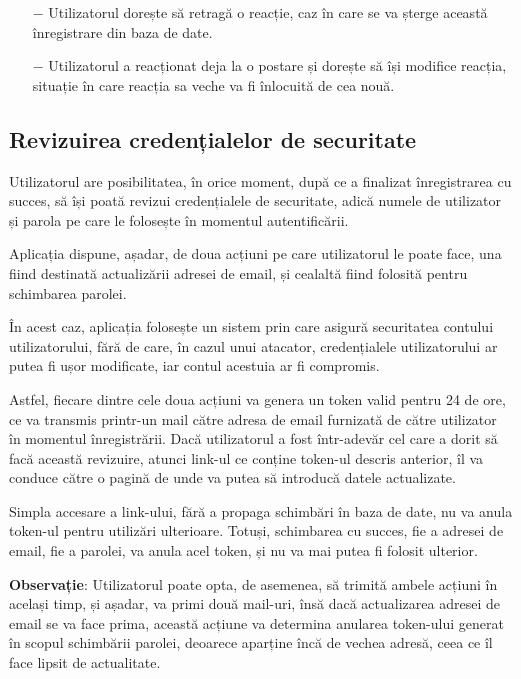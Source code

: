 \begin{itemize}
	\addtolength{\itemindent}{1cm}
	\item[$-$]Utilizatorul dorește să retragă o reacție, caz în care se va șterge această înregistrare din baza de date.
	\item[$-$]Utilizatorul a reacționat deja la o postare și dorește să își modifice reacția, situație în care reacția sa veche va fi înlocuită de cea nouă.
	\newline
\end{itemize}

\subsection{Revizuirea credențialelor de securitate}

Utilizatorul are posibilitatea, în orice moment, după ce a finalizat înregistrarea cu succes, să își poată revizui credențialele de securitate, adică numele de utilizator și parola pe care le folosește în momentul autentificării.\newline

Aplicația dispune, așadar, de  doua acțiuni pe care utilizatorul le poate face, una fiind destinată actualizării adresei de email, și cealaltă fiind folosită pentru schimbarea parolei.\newline

În acest caz, aplicația folosește un sistem prin care asigură securitatea contului utilizatorului, fără de care, în cazul unui atacator, credențialele utilizatorului ar putea fi ușor modificate, iar contul acestuia ar fi compromis.\newline

Astfel, fiecare dintre cele doua acțiuni va genera un token valid pentru 24 de ore, ce va transmis printr-un mail către adresa de email furnizată de către utilizator în momentul înregistrării. Dacă utilizatorul a fost într-adevăr cel care a dorit să facă această revizuire, atunci link-ul ce conține token-ul descris anterior, îl va conduce către o pagină de unde va putea să introducă datele actualizate.\newline

Simpla accesare a link-ului, fără a propaga schimbări în baza de date, nu va anula token-ul pentru utilizări ulterioare. Totuși, schimbarea cu succes, fie a adresei de email, fie a parolei, va anula acel token, și nu va mai putea fi folosit ulterior.\newline

\textbf{Observație}: Utilizatorul poate opta, de asemenea, să trimită ambele acțiuni în același timp, și așadar, va primi două mail-uri, însă dacă actualizarea adresei de email se va face prima, această acțiune va determina anularea token-ului generat în scopul schimbării parolei, deoarece aparține încă de vechea adresă, ceea ce îl face lipsit de actualitate.\newline

